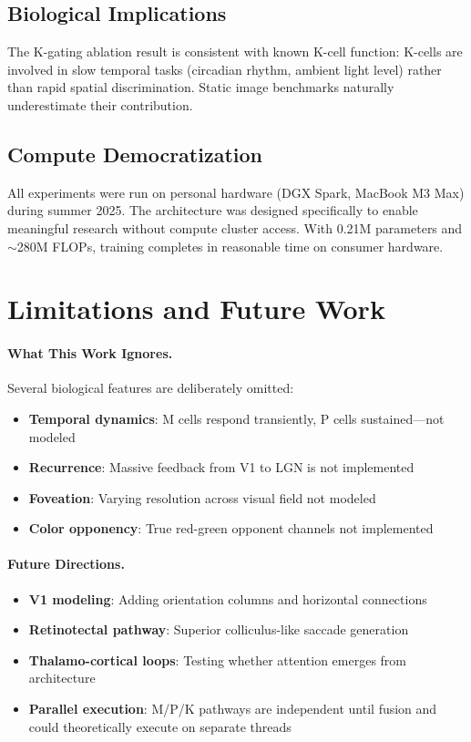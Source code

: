 \documentclass[11pt]{article}
\begin{document}
\subsection{Biological Implications}

The K-gating ablation result is consistent with known K-cell function: K-cells are involved in slow temporal tasks (circadian rhythm, ambient light level) rather than rapid spatial discrimination. Static image benchmarks naturally underestimate their contribution.

\subsection{Compute Democratization}

All experiments were run on personal hardware (DGX Spark, MacBook M3 Max) during summer 2025. The architecture was designed specifically to enable meaningful research without compute cluster access. With 0.21M parameters and $\sim$280M FLOPs, training completes in reasonable time on consumer hardware.

\section{Limitations and Future Work}

\paragraph{What This Work Ignores.} Several biological features are deliberately omitted:
\begin{itemize}
    \item \textbf{Temporal dynamics}: M cells respond transiently, P cells sustained---not modeled
    \item \textbf{Recurrence}: Massive feedback from V1 to LGN is not implemented
    \item \textbf{Foveation}: Varying resolution across visual field not modeled
    \item \textbf{Color opponency}: True red-green opponent channels not implemented
\end{itemize}

\paragraph{Future Directions.}
\begin{itemize}
    \item \textbf{V1 modeling}: Adding orientation columns and horizontal connections
    \item \textbf{Retinotectal pathway}: Superior colliculus-like saccade generation
    \item \textbf{Thalamo-cortical loops}: Testing whether attention emerges from architecture
    \item \textbf{Parallel execution}: M/P/K pathways are independent until fusion and could theoretically execute on separate threads
\end{itemize}
\end{document}
